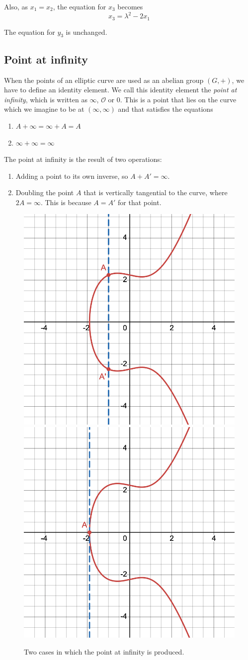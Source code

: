 \documentclass[a4paper]{article}
\begin{document}
Also, as $x_1 = x_2$, the equation for $x_3$ becomes \[x_3 = \lambda^2-2x_1\]

The equation for $y_3$ is unchanged.

\subsection{Point at infinity}\label{poi}

When the points of an elliptic curve are used as an abelian group $(G, +)$, we have to define an identity element. We call this identity element the \textit{point at infinity}, which is written as $\infty$, $\mathcal{O}$ or $0$. This is a point that lies on the curve which we imagine to be at $(\infty, \infty)$ and that satisfies the equations
\begin{enumerate}
    \item $A + \infty = \infty + A = A$
    \item $\infty + \infty = \infty$
\end{enumerate}

The point at infinity is the result of two operations:
\begin{enumerate}
    \item Adding a point to its own inverse, so $A + A' = \infty$.
    \item Doubling the point $A$ that is vertically tangential to the curve, where $2A = \infty$. This is because $A = A'$ for that point.
\end{enumerate}

\begin{figure}[h]
    \centering
    \includegraphics[width=0.3\linewidth]{images/infty-inverse.png}
    \includegraphics[width=0.3\linewidth]{images/infty-tangent.png}
    \caption{Two cases in which the point at infinity is produced.}
    \label{fig:infinity}
\end{figure}
\end{document}
